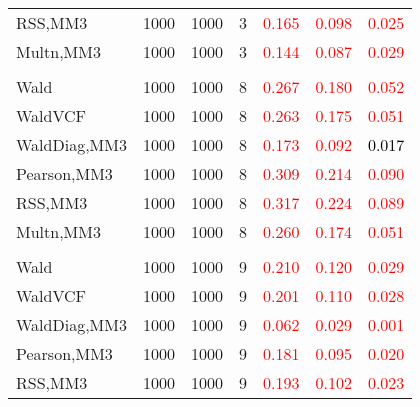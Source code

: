 \documentclass[
]{article}
\begin{document}
\begin{table}[H]
{\begin{tabular}[t]{lrrrrrr}
\hspace{1em}RSS,MM3 & 1000 & 1000 & 3 & \textcolor{red}{0.165} & \textcolor{red}{0.098} & \textcolor{red}{0.025}\\
\hspace{1em}Multn,MM3 & 1000 & 1000 & 3 & \textcolor{red}{0.144} & \textcolor{red}{0.087} & \textcolor{red}{0.029}\\
\addlinespace[0.3em]
\multicolumn{7}{l}{\textbf{1F 15V}}\\
\hspace{1em}Wald & 1000 & 1000 & 8 & \textcolor{red}{0.267} & \textcolor{red}{0.180} & \textcolor{red}{0.052}\\
\hspace{1em}WaldVCF & 1000 & 1000 & 8 & \textcolor{red}{0.263} & \textcolor{red}{0.175} & \textcolor{red}{0.051}\\
\hspace{1em}WaldDiag,MM3 & 1000 & 1000 & 8 & \textcolor{red}{0.173} & \textcolor{red}{0.092} & \textcolor{black}{0.017}\\
\hspace{1em}Pearson,MM3 & 1000 & 1000 & 8 & \textcolor{red}{0.309} & \textcolor{red}{0.214} & \textcolor{red}{0.090}\\
\hspace{1em}RSS,MM3 & 1000 & 1000 & 8 & \textcolor{red}{0.317} & \textcolor{red}{0.224} & \textcolor{red}{0.089}\\
\hspace{1em}Multn,MM3 & 1000 & 1000 & 8 & \textcolor{red}{0.260} & \textcolor{red}{0.174} & \textcolor{red}{0.051}\\
\addlinespace[0.3em]
\multicolumn{7}{l}{\textbf{2F 10V}}\\
\hspace{1em}Wald & 1000 & 1000 & 9 & \textcolor{red}{0.210} & \textcolor{red}{0.120} & \textcolor{red}{0.029}\\
\hspace{1em}WaldVCF & 1000 & 1000 & 9 & \textcolor{red}{0.201} & \textcolor{red}{0.110} & \textcolor{red}{0.028}\\
\hspace{1em}WaldDiag,MM3 & 1000 & 1000 & 9 & \textcolor{red}{0.062} & \textcolor{red}{0.029} & \textcolor{red}{0.001}\\
\hspace{1em}Pearson,MM3 & 1000 & 1000 & 9 & \textcolor{red}{0.181} & \textcolor{red}{0.095} & \textcolor{red}{0.020}\\
\hspace{1em}RSS,MM3 & 1000 & 1000 & 9 & \textcolor{red}{0.193} & \textcolor{red}{0.102} & \textcolor{red}{0.023}\\

\end{tabular}}
\end{table}
\end{document}
